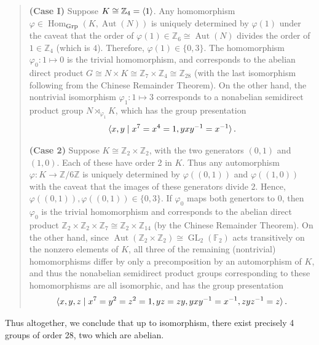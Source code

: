 \documentclass{article}
\begin{document}
	\begin{quote}
		\textbf{(Case I)} Suppose $K \cong \mathbb{Z}_{4} = \braket{1}$. Any homomorphism $\varphi \in \operatorname{Hom}_{\textbf{Grp}}(K, \operatorname{Aut}(N))$ is uniquely determined by $\varphi(1)$ under the caveat that the order of $\varphi(1) \in \mathbb{Z}_{6} \cong \operatorname{Aut}(N)$ divides the order of $1 \in \mathbb{Z}_{4}$ (which is $4$). Therefore, $\varphi(1) \in \{0, 3\}$. The homomorphism $\varphi_{0}: 1 \mapsto 0$ is the trivial homomorphism, and corresponds to the abelian direct product $G \cong N \times K \cong \mathbb{Z}_{7} \times \mathbb{Z}_{4} \cong \mathbb{Z}_{28}$ (with the last isomorphism following from the Chinese Remainder Theorem). On the other hand, the nontrivial isomorphism $\varphi_{1}: 1 \mapsto 3$ corresponds to a nonabelian semidirect product group $N \rtimes_{\varphi_{1}} K$, which has the group presentation 
		\begin{equation*}
			\braket{x, y \mid  x^{7} = x^{4} = 1, yxy^{-1} = x^{-1}}. 
		\end{equation*}
		
		\textbf{(Case 2)} Suppose $K \cong \mathbb{Z}_{2} \times \mathbb{Z}_{2}$, with the two generators $(0,1)$ and $(1,0)$. Each of these have order 2 in $K$. Thus any automorphism $\varphi: K \to \mathbb{Z}/6\mathbb{Z}$ is uniquely determined by $\varphi((0,1))$ and $\varphi((1,0))$ with the caveat that the images of these generators divide $2$. Hence, $\varphi((0,1)), \varphi((0,1)) \in \{0,3\}$. If $\varphi_{0}$ maps both genertors to $0$, then $\varphi_{0}$ is the trivial homomorphism and corresponds to the abelian direct product $\mathbb{Z}_{2}\times \mathbb{Z}_{2} \times \mathbb{Z}_{7} \cong \mathbb{Z}_{2} \times \mathbb{Z}_{14}$ (by the Chinese Remainder Theorem). On the other hand, since $\operatorname{Aut}(\mathbb{Z}_{2} \times \mathbb{Z}_{2}) \cong \operatorname{GL}_{2}(\mathbb{F}_{2})$ acts transitively on the nonzero elements of $K$, all three of the remaining (nontrivial) homomorphisms differ by only a precomposition by an automorphism of $K$, and thus the nonabelian semidirect product groups corresponding to these homomorphisms are all isomorphic, and has the group presentation 		\begin{equation*}
			\braket{x, y, z \mid x^{7} = y^{2} = z^{2} = 1, yz = zy, yxy^{-1} = x^{-1}, zyz^{-1} = z}. 
		\end{equation*}
	\end{quote}
	Thus altogether, we conclude that up to isomorphism, there exist precisely 4 groups of order 28, two which are abelian. 
	
\end{document}
